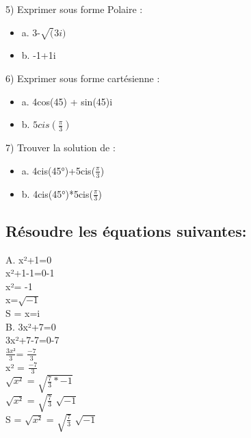 \vspace{3mm} %
5) Exprimer sous forme Polaire :

\begin{itemize}
\item {a. 3-$\sqrt(3i)$}
\item {b. -1+1i}
\end{itemize}

\vspace{3mm} %
6) Exprimer sous forme cartésienne :

\begin{itemize}
\item {a. 4cos(45) + sin(45)i}
\item {b. $5cis(\frac{\pi}{3})$}
\end{itemize}

\vspace{3mm} %
7) Trouver la solution de :

\begin{itemize}
\item {a. 4cis(45°)+5cis($\frac{\pi}{3}$)}
\item {b. 4cis(45°)*5cis($\frac{\pi}{3}$)}
\end{itemize}


\vspace{3mm} %
\subsection{Résoudre les équations suivantes:}
\vspace{3mm} %

A. x²+1=0 \\

x²+1-1=0-1 \\
x²= -1 \\
x=$\sqrt{-1}$ \\
S = x=i \\

\vspace{3mm} %
B. 3x²+7=0 \\

3x²+7-7=0-7 \\

$\frac{3x²}{3}$= $\frac{-7}{3}$ \\

x² = $\frac{-7}{3}$ \\
$\sqrt{x²}$ = $\sqrt{\frac{7}{3} *-1}$ \\
$\sqrt{x²}$ = $\sqrt{\frac{7}{3}}$ $\sqrt{-1}$ \\
S = $\sqrt{x²}$ = $\sqrt{\frac{7}{3}}$ $\sqrt{-1}$ \\


